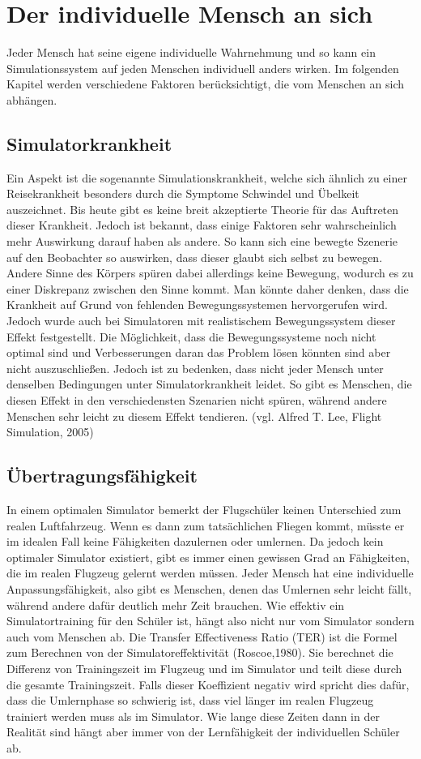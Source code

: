 \documentclass[12pt]{article}
\begin{document}
\section{Der individuelle Mensch an sich}
Jeder Mensch hat seine eigene individuelle Wahrnehmung und so kann ein Simulationssystem auf jeden Menschen individuell anders wirken. Im folgenden Kapitel werden verschiedene Faktoren berücksichtigt, die vom Menschen an sich abhängen.

\subsection{Simulatorkrankheit}
Ein Aspekt ist die sogenannte Simulationskrankheit, welche sich ähnlich zu einer Reisekrankheit besonders durch die Symptome Schwindel und Übelkeit auszeichnet. Bis heute gibt es keine breit akzeptierte Theorie für das Auftreten dieser Krankheit. Jedoch ist bekannt, dass einige Faktoren sehr wahrscheinlich mehr Auswirkung darauf haben als andere. So kann sich eine bewegte Szenerie auf den Beobachter so auswirken, dass dieser glaubt sich selbst zu bewegen. Andere Sinne des Körpers spüren dabei allerdings keine Bewegung, wodurch es zu einer Diskrepanz zwischen den Sinne kommt. Man könnte daher denken, dass die Krankheit auf Grund von fehlenden Bewegungssystemen hervorgerufen wird. Jedoch wurde auch bei Simulatoren mit realistischem Bewegungssystem dieser Effekt festgestellt. Die Möglichkeit, dass die Bewegungssysteme noch nicht optimal sind und Verbesserungen daran das Problem lösen könnten sind aber nicht auszuschließen. Jedoch ist zu bedenken, dass nicht jeder Mensch unter denselben Bedingungen unter Simulatorkrankheit leidet. So gibt es Menschen, die diesen Effekt in den verschiedensten Szenarien nicht spüren, während andere Menschen sehr leicht zu diesem Effekt tendieren. (vgl. Alfred T. Lee, Flight Simulation, 2005)

\subsection{Übertragungsfähigkeit}
In einem optimalen Simulator bemerkt der Flugschüler keinen Unterschied zum realen Luftfahrzeug. Wenn es dann zum tatsächlichen Fliegen kommt, müsste er im idealen Fall keine Fähigkeiten dazulernen oder umlernen. Da jedoch kein optimaler Simulator existiert, gibt es immer einen gewissen Grad an Fähigkeiten, die im realen Flugzeug gelernt werden müssen. Jeder Mensch hat eine individuelle Anpassungsfähigkeit, also gibt es Menschen, denen das Umlernen sehr leicht fällt, während andere dafür deutlich mehr Zeit brauchen. Wie effektiv ein Simulatortraining für den Schüler ist, hängt also nicht nur vom Simulator sondern auch vom Menschen ab. Die Transfer Effectiveness Ratio (TER) ist die Formel zum Berechnen von der Simulatoreffektivität (Roscoe,1980). Sie berechnet die Differenz von Trainingszeit im Flugzeug und im Simulator und teilt diese durch die gesamte Trainingszeit. Falls dieser Koeffizient negativ wird spricht dies dafür, dass die Umlernphase so schwierig ist, dass viel länger im realen Flugzeug trainiert werden muss als im Simulator. Wie lange diese Zeiten dann in der Realität sind hängt aber immer von der Lernfähigkeit der individuellen Schüler ab.
\end{document}
